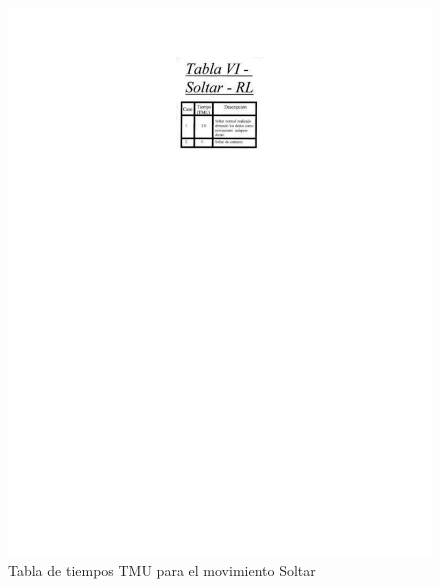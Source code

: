 \begin{figure}[H]
        \centering
        \includegraphics[trim = {42mm 195mm 42mm 24mm},clip,scale=0.6]{19/Img/tablaSoltar.pdf}
        \caption{Tabla de tiempos TMU para el movimiento Soltar}
        \label{fig:tablaSoltar}
    \end{figure}

